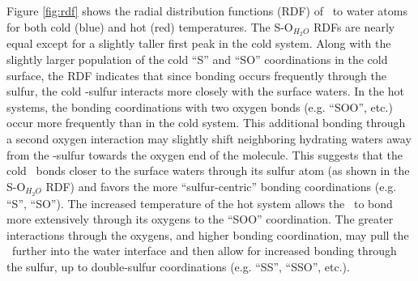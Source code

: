 \documentclass{article}
\begin{document}

Figure \ref{fig:rdf} shows the radial distribution functions (RDF) of \suldiox~to water atoms for both cold (blue) and hot (red) temperatures. The S-O$_{H_2O}$ RDFs are nearly equal except for a slightly taller first peak in the cold system. Along with the slightly larger population of the cold ``S'' and ``SO'' coordinations in the cold surface, the RDF indicates that since bonding occurs frequently through the sulfur, the cold \suldiox-sulfur interacts more closely with the surface waters. In the hot systems, the bonding coordinations with two oxygen bonds (e.g. ``SOO'', etc.) occur more frequently than in the cold system. This additional bonding through a second oxygen interaction may slightly shift neighboring hydrating waters away from the \suldiox-sulfur towards the oxygen end of the molecule. This suggests that the cold \suldiox~bonds closer to the surface waters through its sulfur atom (as shown in the S-O$_{H_2O}$ RDF) and favors the more ``sulfur-centric'' bonding coordinations (e.g. ``S'', ``SO''). The increased temperature of the hot system allows the \suldiox~to bond more extensively through its oxygens to the ``SOO'' coordination. The greater interactions through the oxygens, and higher bonding coordination, may pull the \suldiox~further into the water interface and then allow for increased bonding through the sulfur, up to double-sulfur coordinations (e.g. ``SS'', ``SSO'', etc.).
\end{document}
